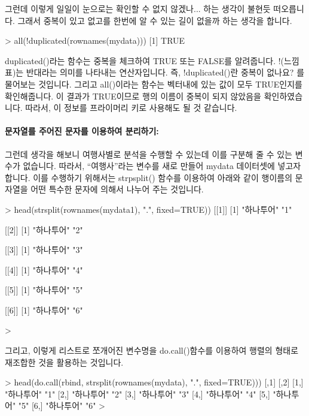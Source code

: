 그런데 이렇게 일일이 눈으로는 확인할 수 없지 않겠나... 하는 생각이 불현듯 떠오릅니다.
그래서 중복이 있고 없고를 한번에 알 수 있는 길이 없을까 하는 생각을 합니다. 

\begin{Schunk}
\begin{Soutput}
> all(!duplicated(rownames(mydata)))
[1] TRUE
\end{Soutput}
\end{Schunk}

duplicated()라는 함수는 중복을 체크하여 TRUE 또는 FALSE를 알려줍니다.
!(느낌표)는 반대라는 의미를 나타내는 연산자입니다.
즉, !duplicated()란 중복이 없나요? 를 물어보는 것입니다.
그리고 all()이라는 함수는 벡터내에 있는 값이 모두 TRUE인지를 확인해줍니다.
이 결과가 TRUE이므로 행의 이름이 중복이 되지 않았음을 확인하였습니다.
따라서, 이 정보를 프라이머리 키로 사용해도 될 것 같습니다.

\paragraph{문자열를 주어진 문자를 이용하여 분리하기:} 
그런데 생각을 해보니 여행사별로 분석을 수행할 수 있는데 이를 구분해 줄 수 있는 변수가 없습니다.
따라서, ``여행사''라는 변수를 새로 만들어 mydata 데이터셋에 넣고자 합니다.
이를 수행하기 위해서는 strpsplit() 함수를 이용하여 아래와 같이 행이름의 문자열을 어떤 특수한 문자에 의해서 나누어 주는 것입니다.

\begin{Schunk}
\begin{Soutput}
> head(strsplit(rownames(mydata1), ".", fixed=TRUE))
[[1]]
[1] "하나투어" "1"       

[[2]]
[1] "하나투어" "2"       

[[3]]
[1] "하나투어" "3"       

[[4]]
[1] "하나투어" "4"       

[[5]]
[1] "하나투어" "5"       

[[6]]
[1] "하나투어" "6"       

>
\end{Soutput}
\end{Schunk}

그리고, 이렇게 리스트로 쪼개어진 변수명을 do.call()함수를 이용하여 행렬의 형태로 재조합한 것을 활용하는 것입니다. 

\begin{Schunk}
\begin{Soutput}
> head(do.call(rbind, strsplit(rownames(mydata), ".", fixed=TRUE)))
     [,1]       [,2]
[1,] "하나투어" "1" 
[2,] "하나투어" "2" 
[3,] "하나투어" "3" 
[4,] "하나투어" "4" 
[5,] "하나투어" "5" 
[6,] "하나투어" "6" 
> 
\end{Soutput}
\end{Schunk}

